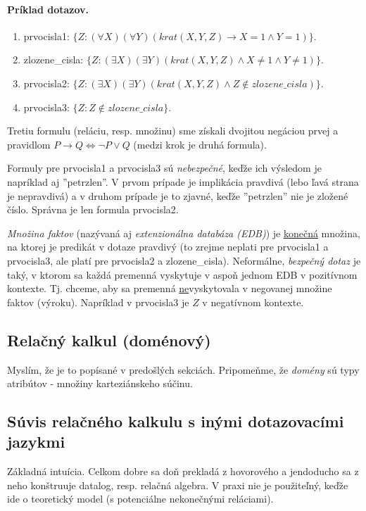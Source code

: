 \documentclass[10pt,a4paper]{article}
\begin{document}
\paragraph{Príklad dotazov.}
\begin{enumerate}
\item prvocisla1: $\{Z : (\forall X) (\forall Y) (krat(X,Y,Z) \rightarrow X = 1 \wedge Y = 1)\}$.
\item zlozene\_cisla: $\{Z : (\exists X) (\exists Y) (krat(X,Y,Z) \wedge X \neq 1 \wedge Y \neq 1)\}$.
\item prvocisla2: $\{Z : (\exists X) (\exists Y) (krat(X,Y,Z) \wedge Z \notin zlozene\_cisla) \}$.
\item prvocisla3: $\{Z : Z \notin zlozene\_cisla\}$.
\end{enumerate}
Tretiu formulu (reláciu, resp. množinu) sme získali dvojitou negáciou prvej a pravidlom $P \rightarrow Q \Leftrightarrow \neg P \vee Q$ (medzi krok je druhá formula). 

Formuly pre prvocisla1 a prvocisla3 sú \emph{nebezpečné}, keďže ich výsledom je napríklad aj ''petrzlen''.
V prvom prípade je implikácia pravdivá (lebo ľavá strana je nepravdivá) a v druhom prípade je to zjavné, keďže ''petrzlen'' nie je zložené číslo. 
Správna je len formula prvocisla2. 

\emph{Množina faktov} (nazývaná aj \emph{extenzionálna databáza (EDB)}) je \underline{konečná} množina, na ktorej je predikát v dotaze pravdivý (to zrejme neplati pre prvocisla1 a prvocisla3, ale platí pre prvocisla2 a zlozene\_cisla).
Neformálne, \emph{bezpečný dotaz} je taký, v ktorom sa každá premenná vyskytuje v aspoň jednom EDB v pozitívnom kontexte. Tj. chceme, aby sa premenná \underline{ne}vyskytovala v negovanej množine faktov (výroku). Napríklad v prvocisla3 je $Z$ v negatívnom kontexte.  

\subsection{Relačný kalkul (doménový)}

Myslím, že je to popísané v predošlých sekciách.
Pripomeňme, že \emph{domény} sú typy atribútov - množiny karteziánskeho súčinu.


\subsection{Súvis relačného kalkulu s inými dotazovacími jazykmi}
Základná intuícia. Celkom dobre sa doň prekladá z hovorového a jendoducho sa z neho konštruuje datalog, resp. relačná algebra.
V praxi nie je použiteľný, keďže ide o teoretický model (s potenciálne nekonečnými reláciami). 
    
\end{document}
